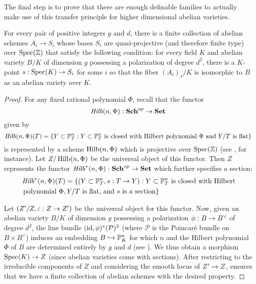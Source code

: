 The final step is to prove that there are enough definable families to actually make use of this transfer principle for higher dimensional abelian varieties.

\begin{lemma}
\label{comprehensive-family}
For every pair of positive integers $g$ and $d$, there is a finite collection of abelian schemes $A_i\rightarrow S_i$ whose bases $S_i$ are quasi-projective (and therefore finite type) over $\operatorname{Spec}(\mathbb{Z})$ that satisfy the following condition: for every field $K$ and abelian variety $B/K$ of dimension $g$ possessing a polarization of degree $d^2$, there is a $K$-point $s:\operatorname{Spec}(K)\rightarrow S_i$ for some $i$ so that the fiber $(A_i)_s/K$ is isomorphic to $B$ as an abelian variety over $K$.
\end{lemma}
\begin{proof} For any fixed rational polynomial $\Phi$, recall that the functor $$\operatorname{\mathit{Hilb}}(n,\Phi):{\normalfont\textbf{Sch}}^{op}\rightarrow {\normalfont\textbf{Set}}$$ given by 
$$\operatorname{\mathit{Hilb}}(n,\Phi)(T)=\{Y\subset \mathbb{P}^n_T: Y\subset \mathbb{P}^n_T\text { is closed with Hilbert polynomial } \Phi\\ \text{ and }Y/T\text{ is flat}\}$$ is represented by a scheme $\operatorname{Hilb}(n,\Phi)$ which is projective over $\operatorname{Spec}(\mathbb{Z})$ (see \cite{FGAHilbert}, for instance). Let $Z/\operatorname{Hilb}(n,\Phi)$ be the universal object of this functor. Then $Z$ represents the functor $\operatorname{\mathit{Hilb}}^*(n,\Phi):{\normalfont\textbf{Sch}}^{op}\rightarrow {\normalfont\textbf{Set}}$ which further specifies a section:
\begin{align*}
&\operatorname{\mathit{Hilb}}^*(n,\Phi)(T)=\{(Y\subset \mathbb{P}^n_T, s: T\rightarrow Y) : Y\subset \mathbb{P}^n_T\text { is closed with Hilbert} \\&\text{ polynomial } \Phi,Y/T\text{ is flat, and } s\text{ is a section}\}
\end{align*}

\noindent Let $(Z'/Z, \varepsilon: Z\rightarrow Z')$ be the universal object for this functor. Now, given an abelian variety $B/K$ of dimension $g$ possessing a polarization $\phi:B\rightarrow B^{\vee}$ of degree $d^2$, the line bundle $(\operatorname{id},\phi)^*(\mathcal{P})^3$ (where $\mathcal{P}$ is the Poincar\'e bundle on $B\times B^{\vee}$) induces an embedding $B\hookrightarrow \mathbb{P}^n_K$ for which $n$ and the Hilbert polynomial $\Phi$ of $B$ are determined entirely by $g$ and $d$ (see \cite[Ch. 3, sec. 16]{mumfordAV}). We thus obtain a morphism $\operatorname{Spec}(K)\rightarrow Z$ (since abelian varieties come with sections). After restricting to the irreducible components of $Z$ and considering the smooth locus of $Z'\rightarrow Z$, \cite[Theorem 6.14]{GIT} ensures that we have a finite collection of abelian schemes with the desired property.
\end{proof}

